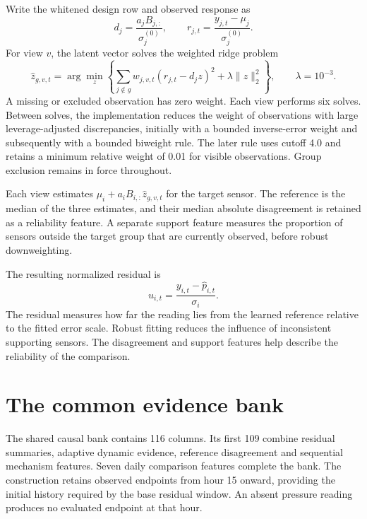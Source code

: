 Write the whitened design row and observed response as
\begin{equation}
 d_j=\frac{a_j B_{j,:}}{\sigma_j^{(0)}},
 \qquad r_{j,t}=\frac{y_{j,t}-\mu_j}{\sigma_j^{(0)}}.
\end{equation}
For view $v$, the latent vector solves the weighted ridge problem
\begin{equation}
 \widehat z_{g,v,t}=\arg\min_z
 \left\{\sum_{j\notin g} w_{j,v,t}(r_{j,t}-d_jz)^2
       +\lambda\lVert z\rVert_2^2\right\},\qquad\lambda=10^{-3}.
 \label{eq:referencefit}
\end{equation}
A missing or excluded observation has zero weight. Each view performs six solves. Between solves, the implementation reduces the weight of observations with large leverage-adjusted discrepancies, initially with a bounded inverse-error weight and subsequently with a bounded biweight rule. The later rule uses cutoff 4.0 and retains a minimum relative weight of 0.01 for visible observations. Group exclusion remains in force throughout.

Each view estimates $\mu_i+a_iB_{i,:}\widehat z_{g,v,t}$ for the target sensor. The reference is the median of the three estimates, and their median absolute disagreement is retained as a reliability feature. A separate support feature measures the proportion of sensors outside the target group that are currently observed, before robust downweighting.

The resulting normalized residual is
\begin{equation}
 u_{i,t}=\frac{y_{i,t}-\widehat p_{i,t}}{\sigma_i}.
\end{equation}
The residual measures how far the reading lies from the learned reference relative to the fitted error scale. Robust fitting reduces the influence of inconsistent supporting sensors. The disagreement and support features help describe the reliability of the comparison.


\section{The common evidence bank}
The shared causal bank contains 116 columns. Its first 109 combine residual summaries, adaptive dynamic evidence, reference disagreement and sequential mechanism features. Seven daily comparison features complete the bank. The construction retains observed endpoints from hour 15 onward, providing the initial history required by the base residual window. An absent pressure reading produces no evaluated endpoint at that hour.


